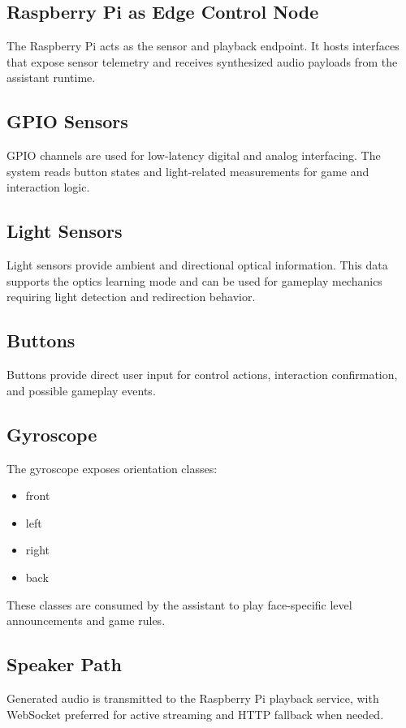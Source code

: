 \documentclass[12pt,a4paper]{article}
\begin{document}
\subsection{Raspberry Pi as Edge Control Node}
The Raspberry Pi acts as the sensor and playback endpoint. It hosts interfaces that expose sensor telemetry and receives synthesized audio payloads from the assistant runtime.

\subsection{GPIO Sensors}
GPIO channels are used for low-latency digital and analog interfacing. The system reads button states and light-related measurements for game and interaction logic.

\subsection{Light Sensors}
Light sensors provide ambient and directional optical information. This data supports the optics learning mode and can be used for gameplay mechanics requiring light detection and redirection behavior.

\subsection{Buttons}
Buttons provide direct user input for control actions, interaction confirmation, and possible gameplay events.

\subsection{Gyroscope}
The gyroscope exposes orientation classes:
\begin{itemize}
    \item front
    \item left
    \item right
    \item back
\end{itemize}
These classes are consumed by the assistant to play face-specific level announcements and game rules.

\subsection{Speaker Path}
Generated audio is transmitted to the Raspberry Pi playback service, with WebSocket preferred for active streaming and HTTP fallback when needed.
\end{document}
